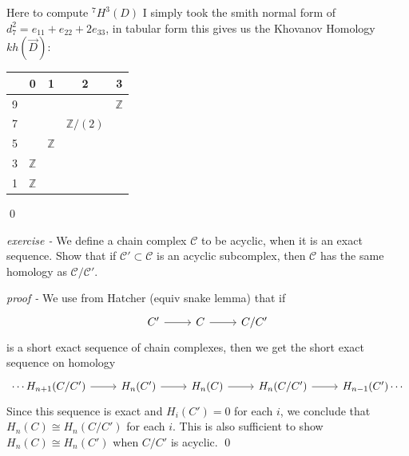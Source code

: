 \documentclass[11pt]{article}
\theoremstyle{definition}
\begin{document}
        Here to compute \({}^7H^3(D)\) I simply took the smith normal form of \(d^2_7 = e_{11} + e_{22} + 2e_{33}\), in tabular form this gives us the Khovanov Homology \(kh(\vec{D})\):
        \begin{center}
            \begin{tabular}{|c|c|c|c|c|}
                &0&1&2&3 \\
                \hline
                9&& & &\(\mathbb{Z}\)\\
                \hline
                7& &&\(\mathbb{Z}/(2)\)\\
                \hline
                5&&\(\mathbb{Z}\)&\\
                \hline
                3&\(\mathbb{Z}\)&&\\
                \hline
                1&\(\mathbb{Z}\)& & & \\
                \hline
            \end{tabular}
        \end{center} \qed


    
    \emph{exercise - } We define a chain complex \(\mathcal{C}\) to be acyclic, when it is an exact sequence. Show that if
    \(\mathcal{C}' \subset \mathcal{C}\) is an acyclic subcomplex, then \(\mathcal{C}\) has the same homology as \(\mathcal{C}/\mathcal{C}'\).

    \emph{proof - } We use from Hatcher (equiv snake lemma) that if
    \begin{equation*}
        \begin{tikzcd}
            C' \arrow[r,"{}"] &C \arrow[r,"{}"] &C/C'
        \end{tikzcd}
    \end{equation*}
    is a short exact sequence of chain complexes, then we get the short exact sequence on homology
    \begin{equation*}
        \begin{tikzcd}
            \cdots H_{n+1}(C/C') \arrow[r,"{}"] &H_n(C') \arrow[r,"{}"] &H_n(C) \arrow[r,"{}"] &H_n(C/C') \arrow[r,"{}"] &H_{n-1}(C') \cdots
        \end{tikzcd}
    \end{equation*}
    Since this sequence is exact and \(H_i(C') = 0\) for each \(i\), we conclude that \(H_n(C) \cong H_n(C/C')\) for each \(i\). This is also sufficient to show \(H_n(C) \cong H_n(C')\) when \(C/C'\) is acyclic. \qed
\end{document}
